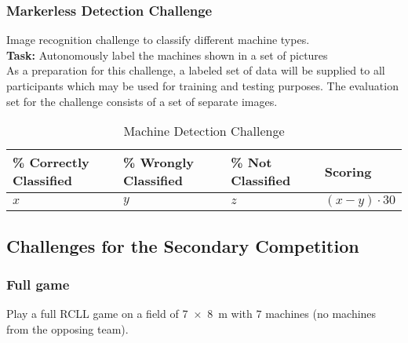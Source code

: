 \documentclass[12pt,twoside]{article}
\begin{document}
\subsubsection{Markerless Detection Challenge}\label{sec:markerless}
Image recognition challenge to classify different machine types.\\
\textbf{Task:} Autonomously label the machines shown in a set of pictures\\
As a preparation for this challenge, a labeled set of data will be supplied to
all participants which may be used for training and testing purposes.
The evaluation set for the challenge consists of a set of separate images.
\begin{table}[!htb]
    \centering
        \begin{tabularx}{\linewidth}{l|l|l|l}
					 \% Correctly Classified & \% Wrongly Classified & \% Not Classified
																	 & Scoring \\\hline
					 $x$ & $y$ & $z$ & $(x-y)\cdot30$
        \end{tabularx}
    \caption{Machine Detection Challenge}
    \label{tab:challenge-markerless}
\end{table}

\subsection{Challenges for the Secondary Competition}

\subsubsection{Full game}\label{sec:challenge-full-game}
Play a full RCLL game on a field of \SI{7 x 8}{\metre} with $7$ machines
(no machines from the opposing team).
\end{document}
